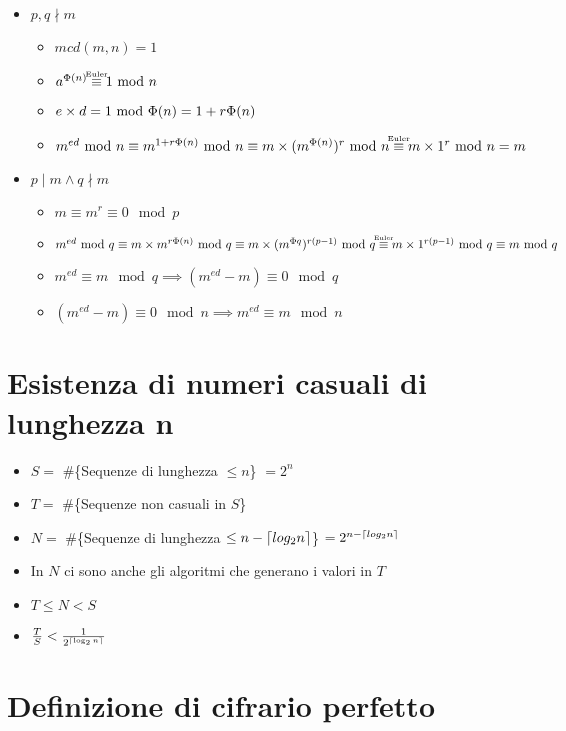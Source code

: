 \begin{itemize}
    \item $p, q \nmid m$
    \begin{itemize}
        \item $mcd(m, n) = 1$
        \item $a^\Pn \dequiv{Euler} 1 \mod{n}$
        \item $e \times d = 1 \ \mathbf{\mathrm{mod}}\ {\Phi(n)} = 1 + r{\Phi(n)}$
        \item $m^{ed} \mod{n} \equiv m^{1 + r\Pn} \mod{n} \equiv m \times (m^\Pn)^r \mod{n} \dequiv{Euler} m \times 1^r \mod{n} = m$
    \end{itemize}
    \item $p \mid m \wedge q \nmid m$
    \begin{itemize}
        \item $m \equiv m^r \equiv 0 \mod{p}$
        \item $m^{ed} \mod{q} \equiv m \times m^{r\Pn} \mod{q} \equiv m \times (m^\Pk{q})^{r(p-1)} \mod{q} \dequiv{Euler} m \times 1^{r(p-1)} \mod{q} \equiv m \mod{q}$
        \item $m^{ed} \equiv m \mod{q} \implies (m^{ed} - m) \equiv 0 \mod{q}$
        \item $(m^{ed} - m) \equiv 0 \mod{n} \implies m^{ed} \equiv m \mod{n}$
    \end{itemize}
\end{itemize}

\section{Esistenza di numeri casuali di lunghezza n}

\begin{itemize}
    \item $S = $ \#\{Sequenze di lunghezza $\leq n$\} $= 2^n$
    \item $T = $ \#\{Sequenze non casuali in $S$\}
    \item $N = $ \#\{Sequenze di lunghezza $\leq n - {\lceil log_2n \rceil}$\} $= 2^{n - {\lceil log_2n \rceil}}$
    \item In $N$ ci sono anche gli algoritmi che generano i valori in $T$
    \item $T \leq N < S$
    \item $\frac{T}{S} < \frac{1}{2^{{\lceil \log_2n \rceil}}}$
\end{itemize}

\section{Definizione di cifrario perfetto}

